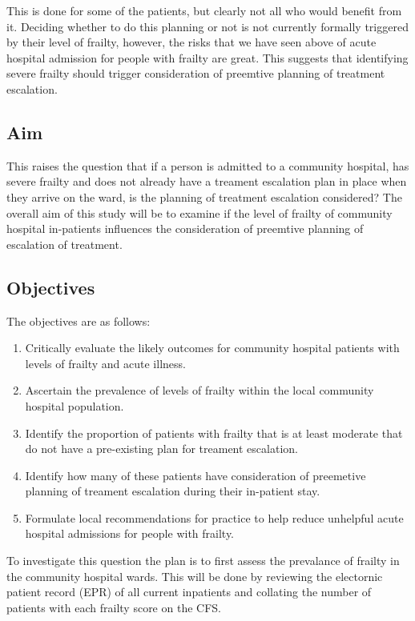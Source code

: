 \documentclass
[
	12pt,
	a4paper,
	oneside,
]{article}
\begin{document}
This is done for some of the patients, but clearly not all who would benefit from it. 
Deciding whether to do this planning or not is not currently formally triggered 
by their level of frailty, however, the risks that we have seen above of acute hospital 
admission for people with frailty are great. This suggests that identifying severe frailty 
should trigger consideration of preemtive planning of treatment escalation.

\subsection{Aim}
This raises the question that if a person is admitted to a community hospital, has 
severe frailty and does not already have a treament escalation plan in place when they 
arrive on the ward, is the planning of treatment escalation considered? The overall 
aim of this study will be to examine if the level of frailty of community hospital
in-patients influences the consideration of preemtive planning of escalation of 
treatment.

\subsection{Objectives}

The objectives are as follows:
\begin{enumerate}
\item	Critically evaluate the likely outcomes for community hospital patients 
		with levels of frailty and acute illness.
\item	Ascertain the prevalence of levels of frailty within the local community
		hospital population.
\item	Identify the proportion of patients with frailty that is at least moderate
		that do not have a pre-existing plan for treament escalation.
\item	Identify how many of these patients have consideration of preemetive planning
		of treament escalation during their in-patient stay.
\item	Formulate local recommendations for practice to help reduce unhelpful
		acute hospital admissions for people with frailty.
\end{enumerate}
To investigate this question the plan is to first assess the prevalance of frailty
in the community hospital wards. This will be done by reviewing the electornic patient record (EPR)
of all current inpatients and collating the number of patients with each frailty score
on the CFS.
\end{document}
